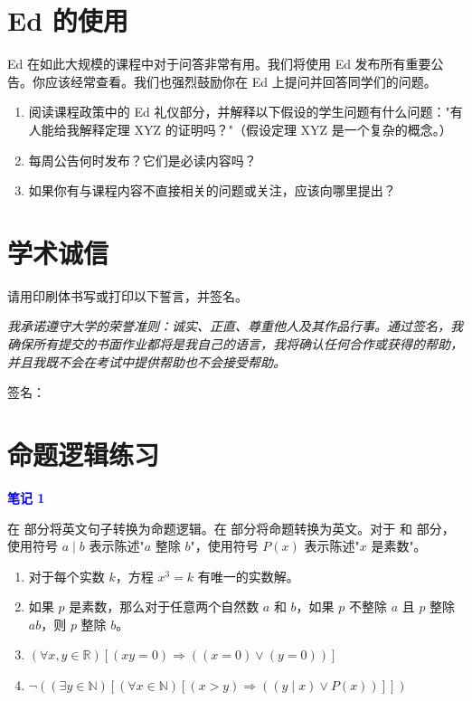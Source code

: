 \documentclass[11pt,a4paper]{article}
\begin{document}
\section{Ed 的使用}

Ed 在如此大规模的课程中对于问答非常有用。我们将使用 Ed 发布所有重要公告。你应该经常查看。我们也强烈鼓励你在 Ed 上提问并回答同学们的问题。

\begin{enumerate}[label=(\alph*)]
    \item 阅读课程政策中的 Ed 礼仪部分，并解释以下假设的学生问题有什么问题："有人能给我解释定理 XYZ 的证明吗？"（假设定理 XYZ 是一个复杂的概念。）
    \item 每周公告何时发布？它们是必读内容吗？
    \item 如果你有与课程内容不直接相关的问题或关注，应该向哪里提出？
\end{enumerate}

\section{学术诚信}

请用印刷体书写或打印以下誓言，并签名。

\begin{tcolorbox}[colback=green!5,colframe=green!50!black]
    \textit{我承诺遵守大学的荣誉准则：诚实、正直、尊重他人及其作品行事。通过签名，我确保所有提交的书面作业都将是我自己的语言，我将确认任何合作或获得的帮助，并且我既不会在考试中提供帮助也不会接受帮助。}
    
    \vspace{1em}
    签名：\underline{\hspace{4cm}}
\end{tcolorbox}

\section{命题逻辑练习}

\textcolor{blue}{\textbf{笔记 1}}

在 部分将英文句子转换为命题逻辑。在 部分将命题转换为英文。对于 和 部分，使用符号 $a \mid b$ 表示陈述"$a$ 整除 $b$"，使用符号 $P(x)$ 表示陈述"$x$ 是素数"。

\begin{enumerate}[label=(\alph*)]
    \item 对于每个实数 $k$，方程 $x^3 = k$ 有唯一的实数解。
    
    \item 如果 $p$ 是素数，那么对于任意两个自然数 $a$ 和 $b$，如果 $p$ 不整除 $a$ 且 $p$ 整除 $ab$，则 $p$ 整除 $b$。
    
    \item $(\forall x,y \in \mathbb{R})[(xy = 0) \Rightarrow ((x = 0) \lor (y = 0))]$
    
    \item $\neg((\exists y \in \mathbb{N})[(\forall x \in \mathbb{N})[(x > y) \Rightarrow ((y \mid x) \lor P(x))]])$
\end{enumerate}
\end{document}

